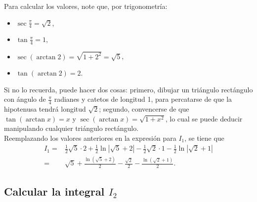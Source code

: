 \documentclass{fmbvecto}
\begin{document}
\begin{problema}
    Para calcular los valores, note que, por trigonometría:
    \begin{itemize}
        \item \(\sec \frac{\pi}{4} = \sqrt{2}\),
        \item \(\tan \frac{\pi}{4} = 1\),
        \item \(\sec (\arctan 2) = \sqrt{1 + 2^2} = \sqrt{5}\),
        \item \(\tan (\arctan 2) = 2\).
    \end{itemize}
    Si no lo recuerda, puede hacer dos cosas: primero, dibujar un triángulo rectángulo con ángulo de \(\frac{\pi}{4}\) radianes y catetos de longitud 1, para percatarse de que la hipotenusa tendrá longitud \(\sqrt{2}\); segundo, convencerse de que \(\tan (\arctan x) = x\) y \(\sec (\arctan x) = \sqrt{1 + x^2}\), lo cual se puede deducir manipulando cualquier triángulo rectángulo. \\
    
    Reemplazando los valores anteriores en la expresión para \(I_1\), se tiene que
    \begin{align*}
        I_1 =& \frac{1}{2} \sqrt{5} \cdot 2 + \frac{1}{2} \ln |\sqrt{5} + 2| - \frac{1}{2} \sqrt{2} \cdot 1 - \frac{1}{2} \ln |\sqrt{2} + 1| \\
        =& \sqrt{5} + \frac{\ln(\sqrt{5} + 2)}{2}  - \frac{\sqrt{2}}{2}  - \frac{\ln(\sqrt{2} + 1)}{2}.
    \end{align*}

    \subsection{Calcular la integral \(I_2\)}


\end{problema}
\end{document}
